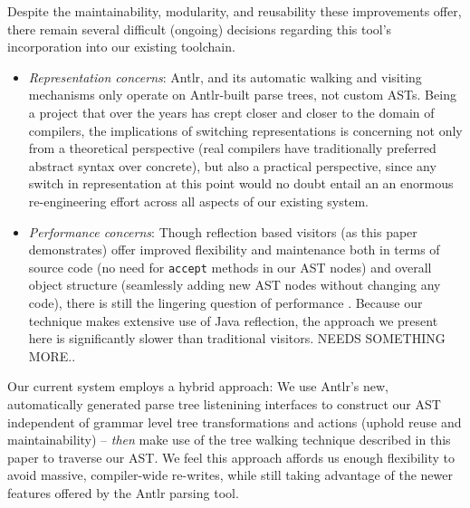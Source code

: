 \documentclass[times]{speauth}
\begin{document}
Despite the maintainability, modularity, and reusability these improvements offer, there remain several difficult (ongoing) decisions regarding this tool's incorporation into our existing toolchain. 

\begin{itemize}
\item \textit{Representation concerns}: Antlr, and its automatic walking and visiting mechanisms only operate on Antlr-built parse trees, not custom ASTs. Being a project that over the years has crept closer and closer to the domain of compilers, the implications of switching representations is concerning not only from a theoretical perspective (real compilers have traditionally preferred abstract syntax over concrete), but also a practical perspective, since any switch in representation at this point would no doubt entail an an enormous re-engineering effort across all aspects of our existing system.

\item \textit{Performance concerns}: Though reflection based visitors (as this paper demonstrates) offer improved flexibility and maintenance both in terms of source code (no need for \texttt{accept} methods in our AST nodes) and overall object structure (seamlessly adding new AST nodes without changing any code), there is still the lingering question of performance \cite{tanumoy:2012}.  Because our technique makes extensive use of Java reflection, the approach we present here is significantly slower than traditional visitors. NEEDS SOMETHING MORE..

\end{itemize}

Our current system employs a hybrid approach: We use Antlr's new, automatically generated parse tree listenining interfaces to construct our AST independent of grammar level tree transformations and actions (uphold reuse and maintainability) -- \textit{then} make use of the tree walking technique described in this paper to traverse our AST. We feel this approach affords us enough flexibility to avoid massive, compiler-wide re-writes, while still taking advantage of the newer features offered by the Antlr parsing tool.

\end{document}
